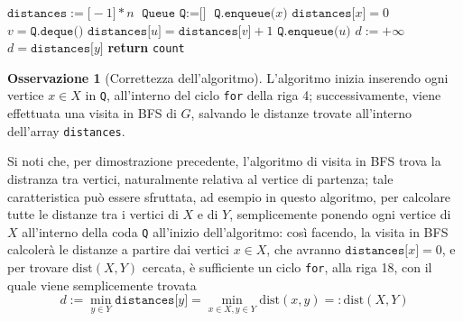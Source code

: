 \documentclass[14pt]{extreport}
\theoremstyle{definition}
\theoremstyle{definition}
\newtheorem{remark}{Osservazione}[subsection]
\begin{document}
\begin{algorithm}[H]
    \caption{
        Dato un grafo $G$, rappresentato attraverso liste di adiacenza, e due suoi sottoinsiemi di vertici $X, Y \subseteq V(G)$, l'algoritmo restituisce $\mathrm{dist}(X, Y)$.\\
        \textbf{Input}: $G$ grafo, rappresentato attraverso liste di adiacenza; $X, Y \subseteq V(G)$ sottoinsiemi di vertici di $G$.\\
        \textbf{Output}: $\mathrm{dist}(X, Y)$.
    }

    \begin{algorithmic}[1]
            \State $\texttt{distances}:=\texttt{[}-1\texttt{]} * n$
            \State $\texttt{Queue Q} := \texttt{[}\texttt{]}$
                \State $\texttt{Q.enqueue(}x\texttt{)}$
                \State $\texttt{distances[}x\texttt{]} = 0$ 
            \EndFor
                \State $v = \texttt{Q.deque()}$
                     
                        \State $\texttt{distances[}u\texttt{]}=\texttt{distances[}v\texttt{]} + 1$
                        \State $\texttt{Q.enqueue(}u\texttt{)}$
                    \EndIf
                \EndFor
            \EndWhile
            \State $d := + \infty$
                    \State $d = \texttt{distances[}y\texttt{]}$
                \EndIf
            \EndFor
            \State \textbf{return} \texttt{count}
        \EndFunction
    \end{algorithmic}
\end{algorithm}

\begin{remark}[Correttezza dell'algoritmo]
    L'algoritmo inizia inserendo ogni vertice $x \in X$ in \texttt{Q}, all'interno del ciclo \texttt{for} della riga 4; successivamente, viene effettuata una visita in BFS di $G$, salvando le distanze trovate all'interno dell'array \texttt{distances}.

    Si noti che, per dimostrazione precedente, l'algoritmo di visita in BFS trova la distranza tra vertici, naturalmente relativa al vertice di partenza; tale caratteristica può essere sfruttata, ad esempio in questo algoritmo, per calcolare tutte le distanze tra i vertici di $X$ e di $Y$, semplicemente ponendo ogni vertice di $X$ all'interno della coda \texttt{Q} all'inizio dell'algoritmo: così facendo, la visita in BFS calcolerà le distanze a partire dai vertici $x \in X$, che avranno $\texttt{distances[}x\texttt{]} = 0$, e per trovare $\mathrm{dist}(X, Y)$ cercata, è sufficiente un ciclo \texttt{for}, alla riga 18, con il quale viene semplicemente trovata $$\displaystyle d := \min_{y \in Y}{\texttt{distances[}y\texttt{]}} = \min_{x \in X, y \in Y}{\mathrm{dist}(x, y)} =: \mathrm{dist}(X, Y)$$
\end{remark}
\end{document}
